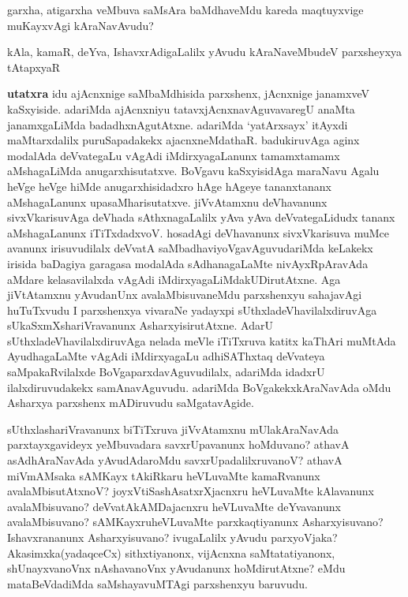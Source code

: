 
\begin{artha}
garxha, atigarxha veMbuva saMsAra baMdhaveMdu kareda maqtuyxvige muKayxvAgi kAraNavAvudu?

kAla, kamaR, deYva, IshavxrAdigaLalilx yAvudu kAraNaveMbudeV parxsheyxya tAtapxyaR\ndash 

\textbf{utatxra \ndash } idu ajAcnxnige saMbaMdhisida parxshenx, jAcnxnige janamxveV kaSxyiside. adariMda ajAcnxniyu tatavxjAcnxnavAguvavaregU  anaMta janamxgaLiMda badadhxnAgutAtxne. adariMda `yatArxsayx' itAyxdi maMtarxdalilx puruSapadakekx ajacnxneMdathaR. badukiruvAga aginx modalAda deVvategaLu vAgAdi iMdirxyagaLanunx tamamxtamamx aMshagaLiMda anugarxhisutatxve. BoVgavu kaSxyisidAga maraNavu Agalu heVge heVge hiMde  anugarxhisidadxro hAge hAgeye tananxtananx aMshagaLanunx upasaMharisutatxve. jiVvAtamxnu deVhavanunx sivxVkarisuvAga deVhada sAthxnagaLalilx yAva yAva deVvategaLidudx tananx aMshagaLanunx iTiTxdadxvoV. hosadAgi deVhavanunx sivxVkarisuva muMce avanunx irisuvudilalx deVvatA saMbadhaviyoVgavAguvudariMda keLakekx irisida baDagiya garagasa modalAda sAdhanagaLaMte nivAyxRpAravAda aMdare kelasavilalxda vAgAdi iMdirxyagaLiMdakUDirutAtxne. Aga jiVtAtamxnu yAvudanUnx avalaMbisuvaneMdu parxshenxyu sahajavAgi huTuTxvudu \ndash  I parxshenxya vivaraNe \ndash  yadayxpi sUthxladeVhavilalxdiruvAga sUkaSxmXshariVravanunx AsharxyisirutAtxne. AdarU sUthxladeVhavilalxdiruvAga nelada meVle iTiTxruva katitx kaThAri muMtAda AyudhagaLaMte vAgAdi iMdirxyagaLu adhiSAThxtaq deVvateya saMpakaRvilalxde BoVgaparxdavAguvudilalx, adariMda idadxrU ilalxdiruvudakekx samAnavAguvudu. adariMda BoVgakekxkAraNavAda oMdu Asharxya parxshenx mADiruvudu saMgatavAgide.

sUthxlashariVravanunx biTiTxruva jiVvAtamxnu mUlakAraNavAda parxtayxgavideyx yeMbuvadara savxrUpavanunx hoMduvano? athavA asAdhAraNavAda yAvudAdaroMdu savxrUpadalilxruvanoV? athavA miVmAMsaka sAMKayx tAkiRkaru heVLuvaMte kamaRvanunx avalaMbisutAtxnoV? joyxVtiSashAsatxrXjacnxru heVLuvaMte kAlavanunx avalaMbisuvano? deVvatAkAMDajacnxru heVLuvaMte deYvavanunx avalaMbisuvano? sAMKayxruheVLuvaMte parxkaqtiyanunx Asharxyisuvano? Ishavxrananunx Asharxyisuvano? ivugaLalilx yAvudu parxyoVjaka? Akasimxka(yadaqceCx) sithxtiyanonx, vijAcnxna saMtatatiyanonx, shUnayxvanoVnx nAshavanoVnx yAvudanunx hoMdirutAtxne? eMdu mataBeVdadiMda saMshayavuMTAgi parxshenxyu baruvudu.


\end{artha}
